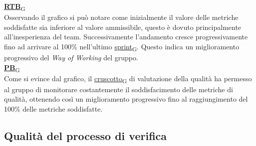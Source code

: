 \begin{flushleft}
\href{https://7last.github.io/docs/pb/documentazione-interna/glossario\#requirements-and-technology-baseline}{\textbf{RTB}\textsubscript{G}} \\
Osservando il grafico si può notare come inizialmente il valore delle metriche soddisfatte sia inferiore al valore ammissibile, questo è dovuto principalmente all'inesperienza del team. Successivamente l'andamento cresce progressivamente fino ad arrivare al 100\% nell'ultimo \href{https://7last.github.io/docs/pb/documentazione-interna/glossario\#sprint}{sprint\textsubscript{G}}. Questo indica un miglioramento progressivo del \textit{Way of Working} del gruppo. \\
\href{https://7last.github.io/docs/pb/documentazione-interna/glossario\#product-baseline}{\textbf{PB}\textsubscript{G}} \\
Come si evince dal grafico, il \href{https://7last.github.io/docs/pb/documentazione-interna/glossario\#cruscotto}{cruscotto\textsubscript{G}} di valutazione della qualità ha permesso al gruppo di monitorare costantemente il soddisfacimento delle metriche di qualità, ottenendo così un miglioramento progressivo fino al raggiungimento del 100\% delle metriche soddisfatte.
\end{flushleft}

\newpage
\subsection{Qualità del processo di verifica}
